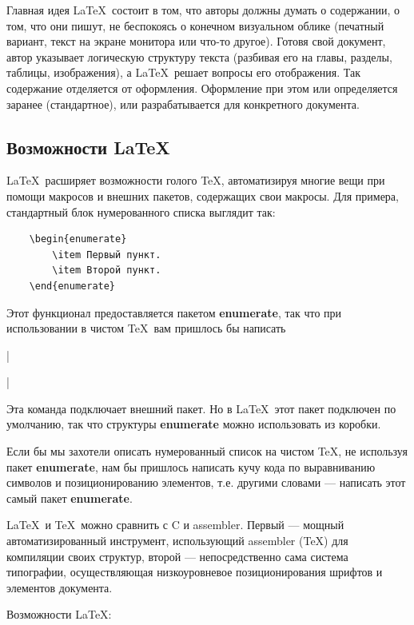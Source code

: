 Главная идея \LaTeX~состоит в том, что авторы должны думать о содержании, о том, что они пишут, не беспокоясь о конечном визуальном облике (печатный вариант, текст на экране монитора или что-то другое). Готовя свой документ, автор указывает логическую структуру текста (разбивая его на главы, разделы, таблицы, изображения), а \LaTeX~решает вопросы его отображения. Так содержание отделяется от оформления. Оформление при этом или определяется заранее (стандартное), или разрабатывается для конкретного документа.

\subsection{Возможности \LaTeX}

\LaTeX~расширяет возможности голого \TeX, автоматизируя многие вещи при помощи макросов и внешних пакетов, содержащих свои макросы. Для примера, стандартный блок нумерованного списка выглядит так:

\begin{verbatim}
    \begin{enumerate}
        \item Первый пункт.
        \item Второй пункт.
    \end{enumerate}
\end{verbatim}

Этот функционал предоставляется пакетом \textbf{enumerate}, так что при использовании в чистом \TeX~вам пришлось бы написать

|\usepackage{enumerate}|

Эта команда подключает внешний пакет. Но в \LaTeX~этот пакет подключен по умолчанию, так что структуры \textbf{enumerate} можно использовать из коробки.

Если бы мы захотели описать нумерованный список на чистом \TeX, не используя пакет \textbf{enumerate}, нам бы пришлось написать кучу кода по выравниванию символов и позиционированию элементов, т.е. другими словами --- написать этот самый пакет \textbf{enumerate}.

\LaTeX~и \TeX~можно сравнить с C и assembler. Первый --- мощный автоматизированный инструмент, использующий assembler (\TeX) для компиляции своих структур, второй --- непосредственно сама система типографии, осуществляющая низкоуровневое позиционирования шрифтов и элементов документа.

Возможности \LaTeX:

